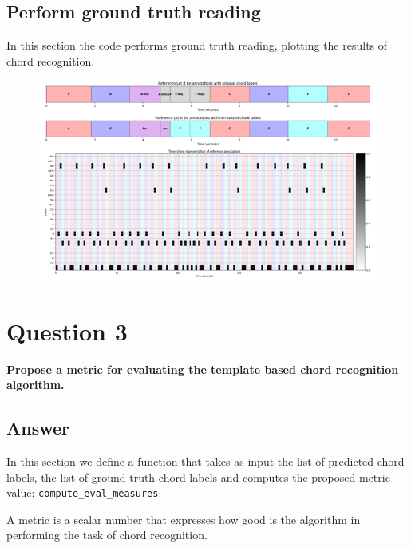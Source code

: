 \documentclass[
	12pt, %
]{fphw}
\begin{document}
\subsection*{Perform ground truth reading}

In this section the code performs ground truth reading, plotting the results of chord recognition.

\begin{figure}[H]
 \centering
 \includegraphics[scale=1]{./images/2_reference_annotations.png}
\end{figure}


\section*{\color{red}Question 3}

\begin{problem}
	\textbf{Propose a metric for evaluating the template based chord recognition algorithm.}
\end{problem}

\subsection*{\color{blue}Answer}

In this section we define a function that takes as input the list of predicted chord labels, the list of ground truth chord labels and computes the proposed metric value: \verb|compute_eval_measures|.

A metric is a scalar number that expresses how good is the algorithm in performing the task of chord recognition.\\
\end{document}
